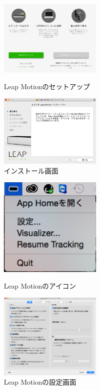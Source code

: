 \documentclass{funthesis}
\begin{document}
\begin{figure}[H]
 \begin{minipage}{0.5\hsize}
  \begin{center}
  \includegraphics[width=50mm]{./img/setup.png}
  \end{center}
  \caption{Leap Motionのセットアップ}
  \label{setup}
 \end{minipage}
 \begin{minipage}{0.5\hsize}
  \begin{center}
  \includegraphics[width=50mm]{./img/installer.png}
  \end{center}
  \caption{インストール画面}
  \label{install}
  \end{minipage}
\end{figure}

\begin{figure}[H]
 \begin{minipage}{0.5\hsize}
  \begin{center}
  \includegraphics[width=50mm]{./img/setting.png}
  \end{center}
  \caption{Leap Motionのアイコン}
  \label{setting}
 \end{minipage}
 \begin{minipage}{0.5\hsize}
  \begin{center}
  \includegraphics[width=50mm]{./img/Lset.png}
  \end{center}
  \caption{Leap Motionの設定画面}
  \label{Lset}
 \end{minipage}
\end{figure}



\listoffigures

\listoftables
\end{document}
